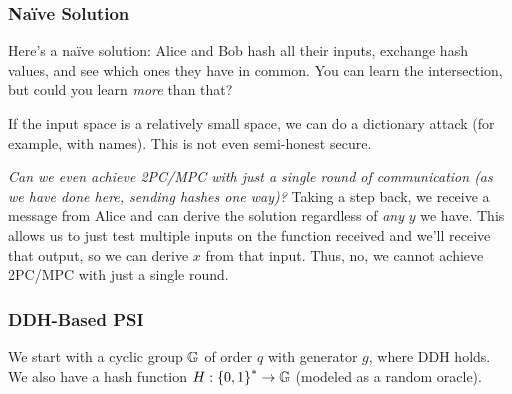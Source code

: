 \subsubsection{Na\"ive Solution}
Here's a na\"ive solution: Alice and Bob hash all their inputs, exchange hash values, and see which ones they have in common. You can learn the intersection, but could you learn \emph{more} than that?


If the input space is a relatively small space, we can do a dictionary attack (for example, with names). This is not even semi-honest secure.

\emph{Can we even achieve 2PC/MPC with just a single round of communication (as we have done here, sending hashes one way)?} Taking a step back, we receive a message from Alice and can derive the solution regardless of \emph{any} $y$ we have. This allows us to just test multiple inputs on the function received and we'll receive that output, so we can derive $x$ from that input. Thus, no, we cannot achieve 2PC/MPC with just a single round.

\subsubsection{DDH-Based PSI}\label{sec:apr04-psi-ddh}
We start with a cyclic group $\mathbb G$ of order $q$ with generator $g$, where DDH holds. We also have a hash function $H: \left\{ 0, 1 \right\}^{*}\to \mathbb G$ (modeled as a random oracle).


